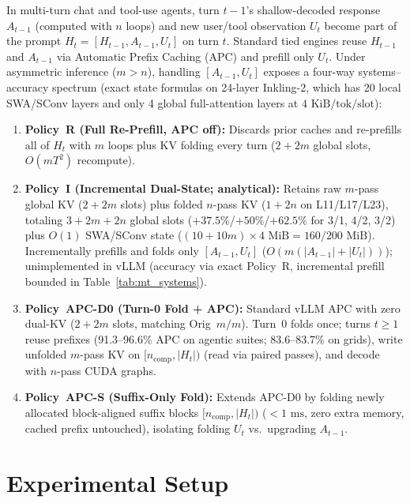 \documentclass[11pt]{article}
\begin{document}
In multi-turn chat and tool-use agents, turn $t{-}1$'s shallow-decoded response $A_{t-1}$ (computed with $n$ loops) and
new user/tool observation $U_t$ become part of the prompt $H_t = [H_{t-1}, A_{t-1}, U_t]$ on turn $t$. Standard tied
engines reuse $H_{t-1}$ and $A_{t-1}$ via Automatic Prefix Caching (APC) and prefill only $U_t$. Under asymmetric
inference ($m{>}n$), handling $[A_{t-1}, U_t]$ exposes a four-way systems--accuracy spectrum (exact state formulas on
24-layer Inkling-2, which has 20 local SWA/SConv layers and only 4 global full-attention layers at $4\text{ KiB/tok/slot}$):
\begin{enumerate}
\item \textbf{Policy~R (Full Re-Prefill, APC off):} Discards prior caches and re-prefills all of $H_t$ with $m$ loops
plus KV folding every turn ($2{+}2m$ global slots, $O(m T^2)$ recompute).
\item \textbf{Policy~I (Incremental Dual-State; analytical):} Retains raw $m$-pass global KV ($2{+}2m$ slots) plus
folded $n$-pass KV ($1{+}2n$ on L11/L17/L23), totaling $3{+}2m{+}2n$ global slots ($+37.5\%$/$+50\%$/$+62.5\%$ for
3/1, 4/2, 3/2) plus $O(1)$ SWA/SConv state ($(10{+}10m){\times}4\text{ MiB} = 160/200\text{ MiB}$). Incrementally
prefills and folds only $[A_{t-1}, U_t]$ ($O(m(|A_{t-1}|{+}|U_t|))$); unimplemented in vLLM (accuracy via exact
Policy~R, incremental prefill bounded in Table~\ref{tab:mt_systems}).
\item \textbf{Policy~APC-D0 (Turn-0 Fold + APC):} Standard vLLM APC with zero dual-KV ($2{+}2m$ slots, matching
Orig~$m/m$). Turn~0 folds once; turns $t{\ge}1$ reuse prefixes (91.3--96.6\% APC on agentic suites; 83.6--83.7\% on
grids), write unfolded $m$-pass KV on $[n_{\text{comp}}, |H_t|)$ (read via paired passes), and decode with $n$-pass CUDA
graphs.
\item \textbf{Policy~APC-S (Suffix-Only Fold):} Extends APC-D0 by folding newly allocated block-aligned suffix blocks
$[n_{\text{comp}}, |H_t|)$ ($<1\text{ ms}$, zero extra memory, cached prefix untouched), isolating folding $U_t$ vs.\
upgrading $A_{t-1}$.
\end{enumerate}

\section{Experimental Setup}
\label{sec:setup}
\end{document}
